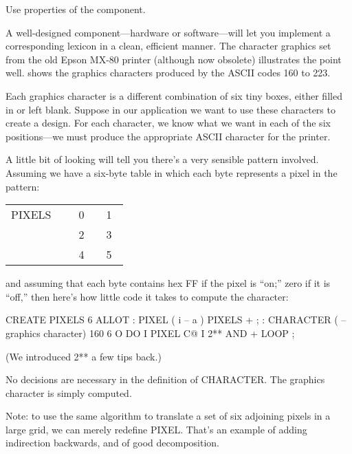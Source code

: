 \begin{tip}
Use properties of the component.
\end{tip}
A well-designed component---hardware or software---will let you implement
a corresponding lexicon in a clean, efficient manner. The character
graphics set from the old Epson MX-80 printer (although now obsolete)
illustrates the point well.  shows the graphics characters
produced by the ASCII codes 160 to 223.



Each graphics character is a different combination of six tiny boxes,
either filled in or left blank. Suppose in our application we want to use
these characters to create a design. For each character, we know what we
want in each of the six positions---we must produce the appropriate
ASCII character for the printer.

A little bit of looking will tell you there's a very sensible pattern
involved. Assuming we have a six-byte table in which each byte represents
a pixel in the pattern:

\bigskip
{\sf\begin{tabular}{l|c|c|} \cline{2-3}
PIXELS~~ & ~0~ & ~1~ \\ \cline{2-3}
       & 2 & 3 \\ \cline{2-3}
       & 4 & 5 \\ \cline{2-3}
\end{tabular}}\bigskip

\noindent and assuming that each byte contains hex FF if the pixel is
``on;'' zero if it is ``off,'' then here's how little code it takes to
compute the character:

\begin{Code}
CREATE PIXELS  6 ALLOT
: PIXEL  ( i -- a )  PIXELS + ;
: CHARACTER  ( -- graphics character)
   160   6 O DO  I PIXEL C@  I 2** AND  +  LOOP ;
\end{Code}
(We introduced 2** a few tips back.)

No decisions are necessary in the definition of CHARACTER. The
graphics character is simply computed.

Note: to use the same algorithm to translate a set of six adjoining
pixels in a large grid, we can merely redefine PIXEL. That's an example
of adding indirection backwards, and of good decomposition.

